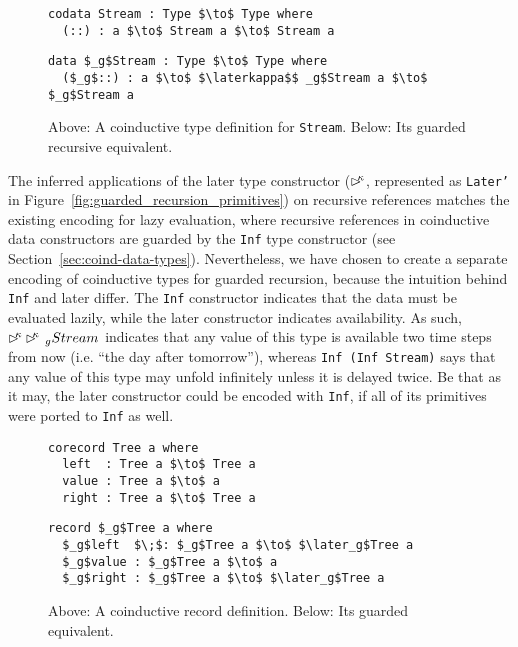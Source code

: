 \begin{figure}[h]
\begin{lstlisting}[mathescape,title=\idrisBlock]
codata Stream : Type $\to$ Type where
  (::) : a $\to$ Stream a $\to$ Stream a
\end{lstlisting}
\begin{lstlisting}[mathescape,title=\idrisBlock]
data $_g$Stream : Type $\to$ Type where
  ($_g$::) : a $\to$ $\laterkappa$$ _g$Stream a $\to$ $_g$Stream a
\end{lstlisting}
  \caption{Above: A coinductive type definition for \texttt{Stream}. Below: Its
    guarded recursive equivalent.}
  \label{fig:guarded_stream_inf}
\end{figure}

The inferred applications of the later type constructor ($\rhd^{\!\!\kappa}$, represented
as \texttt{Later'} in Figure~\ref{fig:guarded_recursion_primitives}) on
recursive references matches the existing encoding for lazy evaluation, where
recursive references in coinductive data constructors are guarded by the
\texttt{Inf} type constructor (see
Section~\ref{sec:coind-data-types}). Nevertheless, we have chosen to create a
separate encoding of coinductive types for guarded recursion, because the
intuition behind \texttt{Inf} and later differ. The \texttt{Inf} constructor
indicates that the data must be evaluated lazily, while the later constructor
indicates availability. As such, $\rhd^{\!\!\kappa}\rhd^{\!\!\kappa}\,_{g}Stream$ indicates that any value of
this type is available two time steps from now (i.e. ``the day after tomorrow''),
whereas \texttt{Inf (Inf Stream)} says that any value of this
type may unfold infinitely unless it is delayed twice. Be that as it may, the
later constructor could be encoded with \texttt{Inf}, if all of its primitives
were ported to \texttt{Inf} as well.

\begin{figure}[h]
\begin{lstlisting}[mathescape,title=\idrisBlock]
corecord Tree a where
  left  : Tree a $\to$ Tree a
  value : Tree a $\to$ a
  right : Tree a $\to$ Tree a
\end{lstlisting}
\begin{lstlisting}[mathescape,title=\idrisBlock]
record $_g$Tree a where
  $_g$left  $\;$: $_g$Tree a $\to$ $\later_g$Tree a
  $_g$value : $_g$Tree a $\to$ a
  $_g$right : $_g$Tree a $\to$ $\later_g$Tree a
\end{lstlisting}
  \caption{Above: A coinductive record definition. Below: Its guarded equivalent.}
  \label{fig:guarded_tree_inf}
\end{figure}

